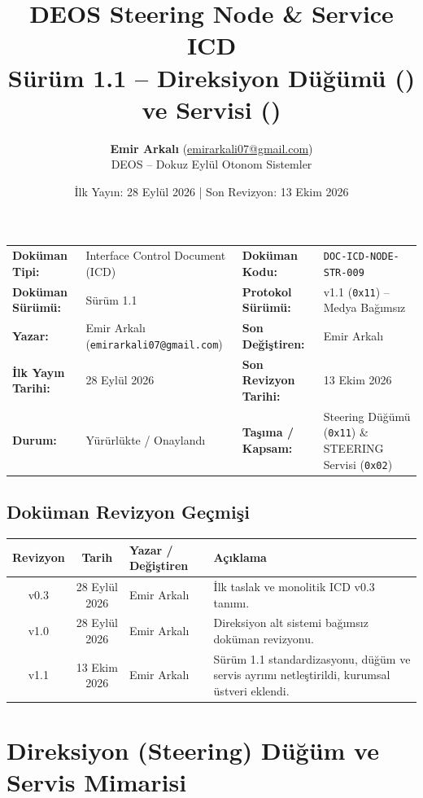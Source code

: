 \documentclass[a4paper,10pt]{article}
\title{\textbf{DEOS Steering Node \& Service ICD}\\
\large Sürüm 1.1 -- Direksiyon Düğümü (\hex{11}) ve Servisi (\hex{02})}
\author{\textbf{Emir Arkalı} (\href{mailto:emirarkali07@gmail.com}{emirarkali07@gmail.com})\\DEOS -- Dokuz Eylül Otonom Sistemler}
\date{İlk Yayın: 28 Eylül 2026 \quad | \quad Son Revizyon: 13 Ekim 2026}
\newcommand{\hex}[1]{\texttt{0x#1}}
\newcommand{\code}[1]{\texttt{#1}}
\begin{document}
\maketitle

\begin{center}
\small
\begin{tabularx}{\textwidth}{ll lX}
\toprule
\textbf{Doküman Tipi:} & Interface Control Document (ICD) & \textbf{Doküman Kodu:} & \code{DOC-ICD-NODE-STR-009} \\
\textbf{Doküman Sürümü:} & Sürüm 1.1 & \textbf{Protokol Sürümü:} & v1.1 (\hex{11}) -- Medya Bağımsız \\
\textbf{Yazar:} & Emir Arkalı (\texttt{emirarkali07@gmail.com}) & \textbf{Son Değiştiren:} & Emir Arkalı \\
\textbf{İlk Yayın Tarihi:} & 28 Eylül 2026 & \textbf{Son Revizyon Tarihi:} & 13 Ekim 2026 \\
\textbf{Durum:} & Yürürlükte / Onaylandı & \textbf{Taşıma / Kapsam:} & Steering Düğümü (\hex{11}) \& STEERING Servisi (\hex{02}) \\
\bottomrule
\end{tabularx}
\end{center}

\subsection*{Doküman Revizyon Geçmişi}
\begin{center}
\small
\begin{tabularx}{\textwidth}{c c l X}
\toprule
\textbf{Revizyon} & \textbf{Tarih} & \textbf{Yazar / Değiştiren} & \textbf{Açıklama} \\
\midrule
v0.3 & 28 Eylül 2026 & Emir Arkalı & İlk taslak ve monolitik ICD v0.3 tanımı. \\
v1.0 & 28 Eylül 2026 & Emir Arkalı & Direksiyon alt sistemi bağımsız doküman revizyonu. \\
v1.1 & 13 Ekim 2026 & Emir Arkalı & Sürüm 1.1 standardizasyonu, düğüm ve servis ayrımı netleştirildi, kurumsal üstveri eklendi. \\
\bottomrule
\end{tabularx}
\end{center}
\vspace{0.8em}

\section{Direksiyon (Steering) Düğüm ve Servis Mimarisi}
\end{document}
